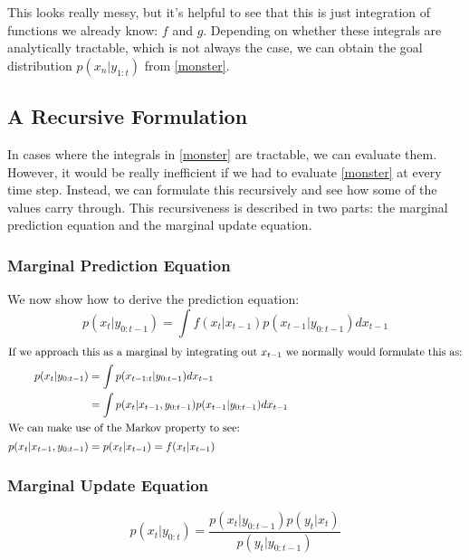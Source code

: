 \documentclass{article}
\begin{document}
This looks really messy, but it's helpful to see that this is just integration of functions we already know: $f$ and $g$. Depending on whether these integrals are analytically tractable, which is not always the case, we can obtain the goal distribution $p(x_n|y_{1:t})$ from \eqref{monster}.


\subsection{A Recursive Formulation}
In cases where the integrals in \eqref{monster} are tractable, we can evaluate them. However, it would be really inefficient if we had to evaluate \eqref{monster} at every time step. Instead, we can formulate this recursively and see how some of the values carry through. This recursiveness is described in two parts: the marginal prediction equation and the marginal update equation.

\subsubsection{Marginal Prediction Equation}
We now show how to derive the prediction equation:
\begin{equation} \label{mpredict}
p(x_t|y_{0:t-1}) = \int f(x_t|x_{t-1})p(x_{t-1}|y_{0:t-1}) dx_{t-1}
\end{equation}
\begin{align*}
\intertext{If we approach this as a marginal by integrating out $x_{t-1}$ we normally would formulate this as:}
p(x_t|y_{0:t-1}) &= \int p(x_{t-1:t}|y_{0:t-1}) dx_{t-1}\\
&= \int p(x_t|x_{t-1},y_{0:t-1})p(x_{t-1}|y_{0:t-1}) dx_{t-1}\\
\intertext{We can make use of the Markov property to see:}
p(x_t|x_{t-1},y_{0:t-1}) &= p(x_t|x_{t-1}) = f(x_t|x_{t-1})\\
\end{align*}

\subsubsection{Marginal Update Equation}
\begin{equation} \label{mupdate}
p(x_t|y_{0:t}) = \frac{p(x_t|y_{0:t-1})p(y_t|x_t)}{p(y_t|y_{0:t-1})}
\end{equation}
\end{document}

